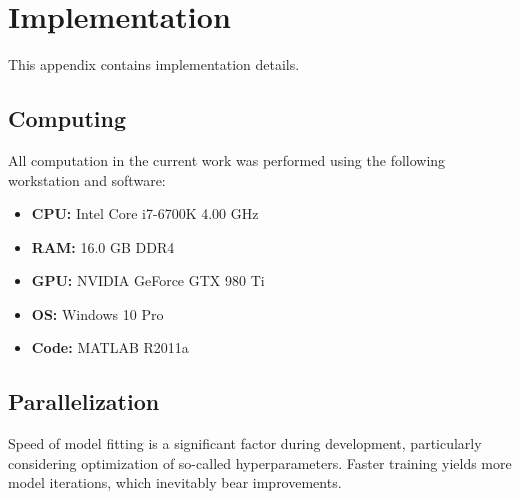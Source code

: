 \chapter{Implementation}
This appendix contains implementation details.
\section{Computing}
All computation in the current work was performed using the following workstation and software:
\begin{itemize}[topsep=0pt,itemsep=-6pt]
  \item \textbf{CPU:} Intel Core i7-6700K 4.00 GHz
  \item \textbf{RAM:} 16.0 GB DDR4
  \item \textbf{GPU:} NVIDIA GeForce GTX 980 Ti
  \item \textbf{OS:} Windows 10 Pro
  \item \textbf{Code:} MATLAB R2011a
\end{itemize}
\section{Parallelization}
Speed of model fitting is a significant factor during development, particularly considering optimization of so-called hyperparameters. Faster training yields more model iterations, which inevitably bear improvements. 
